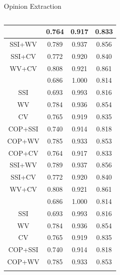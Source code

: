 \documentclass[compress]{beamer}
\begin{document}
\begin{frame}{Opinion Extraction}
\begin{columns}
\begin{column}[T]{.6\textwidth}
\begin{table}
\begin{tabular}{cccc}
{                        COP+CV     & 0.764     & 0.917  & 0.833   \\ \hline
                        SSI+WV     & 0.789     & 0.937  & 0.856   \\ \hline
                        SSI+CV     & 0.772     & 0.920  & 0.840   \\ \hline
                        WV+CV      & 0.808     & 0.921  & 0.861   \\ \hline
                    }
                    \only<2>{
                        COP        & 0.686     & 1.000  & 0.814   \\ \hline
                        SSI        & 0.693     & 0.993  & 0.816   \\ \hline
                        WV         & 0.784     & 0.936  & \cellcolor{red}0.854   \\ \hline
                        CV         & 0.765     & 0.919  & \cellcolor{green}0.835   \\ \hline
                        COP+SSI    & 0.740     & 0.914  & 0.818   \\ \hline
                        COP+WV     & 0.785     & 0.933  & \cellcolor{red}0.853   \\ \hline
                        COP+CV     & 0.764     & 0.917  & \cellcolor{green}0.833   \\ \hline
                        SSI+WV     & 0.789     & 0.937  & \cellcolor{red}0.856   \\ \hline
                        SSI+CV     & 0.772     & 0.920  & \cellcolor{green}0.840   \\ \hline
                        WV+CV      & 0.808     & 0.921  & 0.861   \\ \hline
                    }
                    \only<3>{
                        COP        & 0.686     & 1.000  & \cellcolor{green!50}0.814   \\ \hline
                        SSI        & 0.693     & 0.993  & \cellcolor{cyan!50}0.816   \\ \hline
                        WV         & 0.784     & 0.936  & \cellcolor{blue!30}0.854   \\ \hline
                        CV         & 0.765     & 0.919  & \cellcolor{blue!30}0.835   \\ \hline
                        COP+SSI    & 0.740     & 0.914  & \cellcolor{green}0.818   \\ \hline
                        COP+WV     & 0.785     & 0.933  & \cellcolor{green}0.853   \\ \hline
}
\end{tabular}
\end{table}
\end{column}
\end{columns}
\end{frame}
\end{document}
